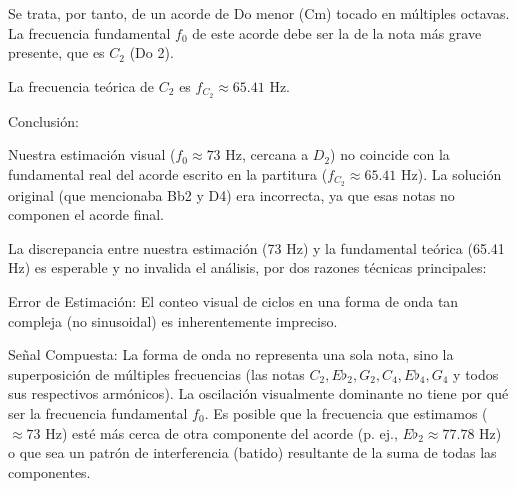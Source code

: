 \documentclass[paper=letter, fontsize=11pt, draft=false]{scrartcl}
\numberwithin{equation}{problemcounter} %
\numberwithin{figure}{problemcounter} %
\numberwithin{table}{problemcounter} %
\numberwithin{subsection}{problemcounter}
\begin{document}
Se trata, por tanto, de un acorde de Do menor (Cm) tocado en múltiples octavas. La frecuencia fundamental $f_0$ de este acorde debe ser la de la nota más grave presente, que es $C_2$ (Do 2).

La frecuencia teórica de $C_2$ es $f_{C_2} \approx 65.41 \text{ Hz}$.

Conclusión:

Nuestra estimación visual ($f_0 \approx 73 \text{ Hz}$, cercana a $D_2$) no coincide con la fundamental real del acorde escrito en la partitura ($f_{C_2} \approx 65.41 \text{ Hz}$). La solución original (que mencionaba Bb2 y D4) era incorrecta, ya que esas notas no componen el acorde final.

La discrepancia entre nuestra estimación (73 Hz) y la fundamental teórica (65.41 Hz) es esperable y no invalida el análisis, por dos razones técnicas principales:

Error de Estimación: El conteo visual de ciclos en una forma de onda tan compleja (no sinusoidal) es inherentemente impreciso.

Señal Compuesta: La forma de onda no representa una sola nota, sino la superposición de múltiples frecuencias (las notas $C_2, E\flat_2, G_2, C_4, E\flat_4, G_4$ y todos sus respectivos armónicos). La oscilación visualmente dominante no tiene por qué ser la frecuencia fundamental $f_0$. Es posible que la frecuencia que estimamos ($\approx 73 \text{ Hz}$) esté más cerca de otra componente del acorde (p. ej., $E\flat_2 \approx 77.78 \text{ Hz}$) o que sea un patrón de interferencia (batido) resultante de la suma de todas las componentes.
\end{document}
